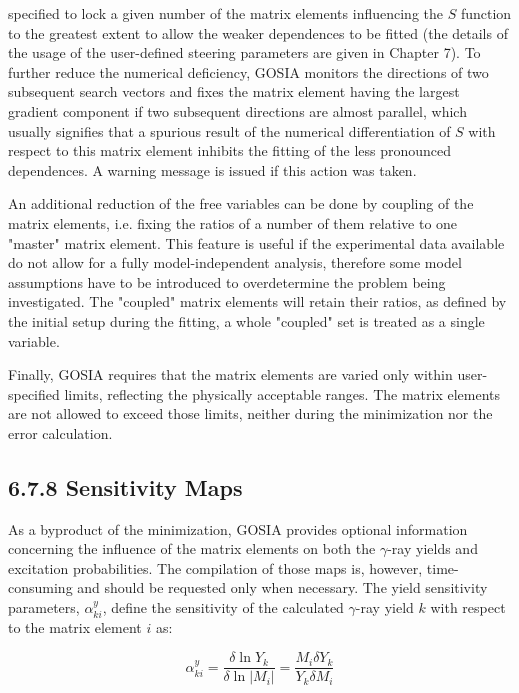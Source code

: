 \documentclass[10pt]{article}
\begin{document}
specified to lock a given number of the matrix elements influencing the $S$ function to the greatest extent to allow the weaker dependences to be fitted (the details of the usage of the user-defined steering parameters are given in Chapter 7). To further reduce the numerical deficiency, GOSIA monitors the directions of two subsequent search vectors and fixes the matrix element having the largest gradient component if two subsequent directions are almost parallel, which usually signifies that a spurious result of the numerical differentiation of $S$ with respect to this matrix element inhibits the fitting of the less pronounced dependences. A warning message is issued if this action was taken.

An additional reduction of the free variables can be done by coupling of the matrix elements, i.e. fixing the ratios of a number of them relative to one "master" matrix element. This feature is useful if the experimental data available do not allow for a fully model-independent analysis, therefore some model assumptions have to be introduced to overdetermine the problem being investigated. The "coupled" matrix elements will retain their ratios, as defined by the initial setup during the fitting, a whole "coupled" set is treated as a single variable.

Finally, GOSIA requires that the matrix elements are varied only within user-specified limits, reflecting the physically acceptable ranges. The matrix elements are not allowed to exceed those limits, neither during the minimization nor the error calculation.

\subsection*{6.7.8 Sensitivity Maps}
As a byproduct of the minimization, GOSIA provides optional information concerning the influence of the matrix elements on both the $\gamma$-ray yields and excitation probabilities. The compilation of those maps is, however, time-consuming and should be requested only when necessary. The yield sensitivity parameters, $\alpha_{k i}^{y}$, define the sensitivity of the calculated $\gamma$-ray yield $k$ with respect to the matrix element $i$ as:


\begin{equation*}
\alpha_{k i}^{y}=\frac{\delta \ln Y_{k}}{\delta \ln \left|M_{i}\right|}=\frac{M_{i} \delta Y_{k}}{Y_{k} \delta M_{i}} \tag{6.108}
\end{equation*}
\end{document}
